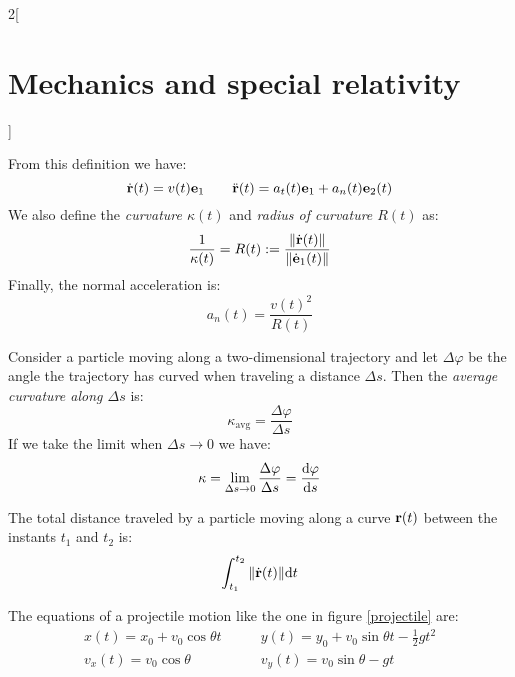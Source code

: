 \documentclass[../../../main.tex]{subfiles}
\begin{document}
\begin{multicols}{2}[\section{Mechanics and special relativity}]
\begin{definition}
        From this definition we have: $$\dot{\boldsymbol{\mathrm{r}}}(t)=v(t)\boldsymbol{\mathrm{e}}_1\qquad\ddot{\boldsymbol{\mathrm{r}}}(t)=a_t(t)\boldsymbol{\mathrm{e}}_1+a_n(t)\boldsymbol{\mathrm{e}}_2(t)$$ We also define the \textit{curvature $\kappa(t)$} and \textit{radius of curvature $R(t)$} as: $$\frac{1}{\kappa(t)}=R(t):=\frac{\|\dot{\boldsymbol{\mathrm{r}}}(t)\|}{\|\dot{\boldsymbol{\mathrm{e}}}_1(t)\|}$$ Finally, the normal acceleration is: $$a_n(t)=\frac{v(t)^2}{R(t)}$$
    \end{definition}
    \begin{prop}[Curvature]
        Consider a particle moving along a two-dimensional trajectory and let $\Delta\varphi$ be the angle the trajectory has curved when traveling a distance $\Delta s$. Then the \textit{average curvature along $\Delta s$} is: $$\kappa_\text{avg}=\frac{\Delta \varphi}{\Delta s}$$ If we take the limit when $\Delta s\to 0$ we have: $$\kappa=\lim_{\Delta s\to 0}\frac{\Delta \varphi}{\Delta s}=\dv{\varphi}{s}$$
    \end{prop}
    \begin{prop}
        The total distance traveled by a particle moving along a curve $\boldsymbol{\mathrm{r}}(t)$ between the instants $t_1$ and $t_2$ is: $$\int_{t_1}^{t_2}\|\dot{\boldsymbol{\mathrm{r}}}(t)\|\dd t$$
    \end{prop}
    \begin{prop}
        The equations of a projectile motion like the one in figure \ref{projectile} are:
        \begin{align*}
            x(t)=x_0+v_0\cos\theta t\quad & \quad y(t)=y_0+v_0\sin\theta t-\frac{1}{2}gt^2 \\
            v_x(t)=v_0\cos\theta\quad     & \quad v_y(t)=v_0\sin\theta-gt
        \end{align*}
        \begin{center}
            \begin{minipage}{\linewidth}
                \centering
                
                \label{projectile}
            \end{minipage}
        \end{center}
    \end{prop}

\end{multicols}
\end{document}
